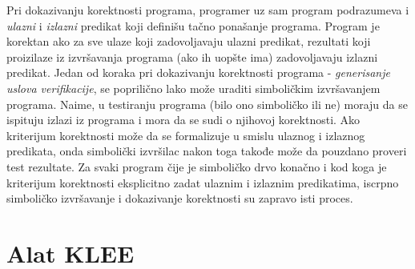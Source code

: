 \documentclass[a4paper]{article}
\begin{document}
Pri dokazivanju korektnosti programa, programer uz sam program podrazumeva i \textit{ulazni} i \textit{izlazni} predikat koji  definišu tačno ponašanje programa. Program je korektan ako za sve ulaze koji zadovoljavaju ulazni predikat, rezultati koji proizilaze iz izvršavanja programa (ako ih uopšte ima) zadovoljavaju izlazni predikat. Jedan od koraka pri dokazivanju korektnosti programa - \textit{generisanje uslova verifikacije}, se poprilično lako može uraditi simboličkim izvršavanjem programa.
Naime, u testiranju programa (bilo ono simboličko ili ne) moraju da se ispituju izlazi iz programa i mora da se sudi o njihovoj korektnosti.  Ako kriterijum korektnosti može da se formalizuje u smislu ulaznog i izlaznog predikata, onda simbolički izvršilac nakon toga takođe može da pouzdano proveri test rezultate. Za svaki program čije je simboličko drvo konačno i kod koga je kriterijum korektnosti eksplicitno zadat ulaznim i izlaznim predikatima, iscrpno simboličko izvršavanje i dokazivanje korektnosti su zapravo isti proces.


\section{Alat KLEE}
\label{sec:naslov3}
\end{document}
